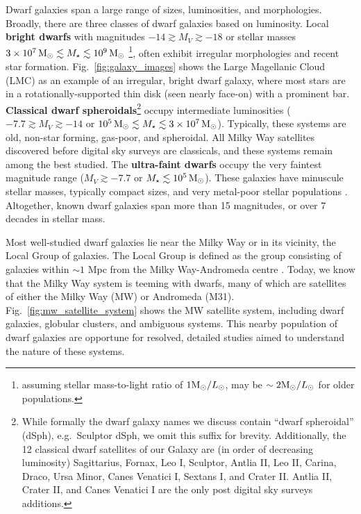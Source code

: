Dwarf galaxies span a large range of sizes, luminosities, and
morphologies. Broadly, there are three classes of dwarf galaxies based
on luminosity. Local \textbf{bright dwarfs} with magnitudes
\(-14 \gtrsim M_V \gtrsim  -18\) or stellar masses
\(3\times10^7\,{\rm M}_{\odot} \lesssim M_\star \lesssim 10^9\,{\rm M}_{\odot}\) \footnote{assuming
  stellar mass-to-light ratio of \(1 {\rm M}_{\odot} / L_{\odot}\), may be
  \(\sim 2 {\rm M}_{\odot}/L_\odot\) for older populations.}, often exhibit
irregular morphologies and recent star formation.
Fig.~\ref{fig:galaxy_images} shows the Large Magellanic Cloud (LMC) as
an example of an irregular, bright dwarf galaxy, where most stars are in
a rotationally-supported thin disk (seen nearly face-on) with a
prominent bar. \textbf{Classical dwarf spheroidals}\footnote{While
  formally the dwarf galaxy names we discuss contain ``dwarf
  spheroidal'' (dSph), e.g.~Sculptor dSph, we omit this suffix for
  brevity. Additionally, the 12 classical dwarf satellites of our Galaxy
  are (in order of decreasing luminosity) Sagittarius, Fornax, Leo I,
  Sculptor, Antlia II, Leo II, Carina, Draco, Ursa Minor, Canes Venatici
  I, Sextans I, and Crater II. Antlia II, Crater II, and Canes Venatici
  I are the only post digital sky surveys additions.} occupy
intermediate luminosities ( \(-7.7 \gtrsim M_V  \gtrsim -14\) or
\(10^5\,{\rm M}_{\odot} \lesssim M_\star \lesssim 3\times10^7\,{\rm M}_{\odot}\)). Typically,
these systems are old, non-star forming, gas-poor, and spheroidal. All
Milky Way satellites discovered before digital sky surveys are
classicals, and these systems remain among the best studied. The
\textbf{ultra-faint dwarfs} occupy the very faintest magnitude range
(\(M_V \gtrsim -7.7\) or \(M_\star \lesssim 10^5\,{\rm M}_{\odot}\)). These galaxies
have minuscule stellar masses, typically compact sizes, and very
metal-poor stellar populations \citep[see the review by][]{simon2019}.
Altogether, known dwarf galaxies span more than 15 magnitudes, or over 7
decades in stellar mass.

Most well-studied dwarf galaxies lie near the Milky Way or in its
vicinity, the Local Group of galaxies. The Local Group is defined as the
group consisting of galaxies within \(\sim 1\) Mpc from the Milky
Way-Andromeda centre \citep[e.g.,][ and references
therein]{mcconnachie2012}. Today, we know that the Milky Way system is
teeming with dwarfs, many of which are satellites of either the Milky
Way (MW) or Andromeda (M31). Fig.~\ref{fig:mw_satellite_system} shows
the MW satellite system, including dwarf galaxies, globular clusters,
and ambiguous systems. This nearby population of dwarf galaxies are
opportune for resolved, detailed studies aimed to understand the nature
of these systems.

